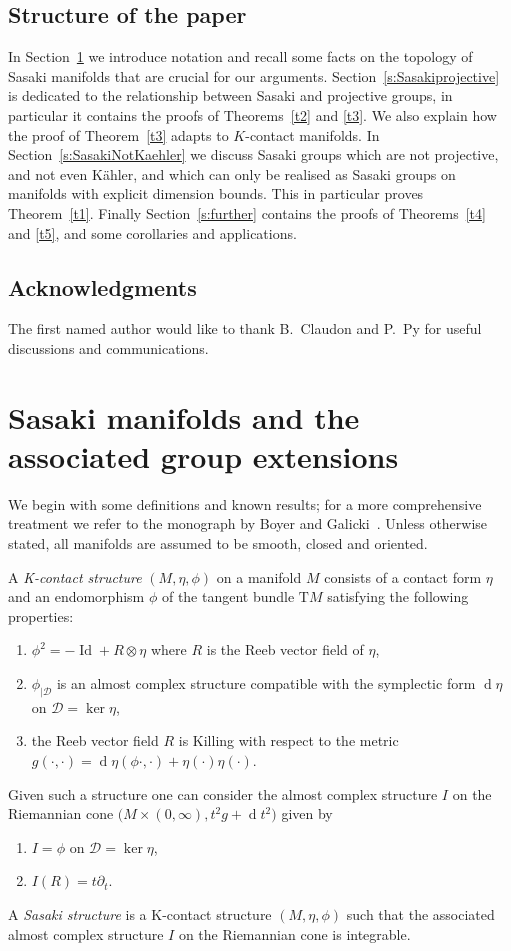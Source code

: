 \documentclass[12pt,leqno]{amsart}
\newcommand{\di}{{\operatorname{d}}}
\newcommand{\Id}{\operatorname{Id}}
\newcommand{\D}{\mathcal{D}}
\newcommand{\TM}{\text{T} M}
\begin{document}
\subsection{Structure of the paper}
In Section~\ref{sectiontop} we introduce notation and recall some facts on the topology of Sasaki manifolds 
that are crucial for our arguments.
Section~\ref{s:Sasakiprojective} is dedicated to the relationship between Sasaki and projective groups, in particular
it contains the proofs of Theorems~\ref{t2} and \ref{t3}. We also explain how the proof of Theorem~\ref{t3} adapts
to $K$-contact manifolds.
In Section~\ref{s:SasakiNotKaehler} we discuss Sasaki groups which are not projective, and not even K\"ahler,
and which can only be realised as Sasaki groups on manifolds with explicit dimension bounds. This in particular
proves Theorem~\ref{t1}.
Finally Section~\ref{s:further} contains the proofs of Theorems~\ref{t4} and \ref{t5}, and some corollaries and 
applications.

\subsection*{Acknowledgments} 
The first named author would like to thank B.~Claudon and P.~Py for useful discussions and communications.



\section{Sasaki manifolds and the associated group extensions}\label{sectiontop}

We begin with some definitions and known results; 
for a more comprehensive treatment we refer to the monograph by Boyer and Galicki~\cite{Boyer}. 
Unless otherwise stated, all manifolds are assumed to be smooth, closed and oriented.

A \textit{K-contact structure} $(M,\eta,\phi)$ on a manifold $M$ consists of a contact form $\eta$ and an endomorphism 
$\phi$ of the tangent bundle 
$\TM$ satisfying the following properties:
\begin{enumerate}
\item[$\bullet$] $\phi^2=-\Id+R\otimes\eta$ where $R$ is the Reeb vector field of $\eta$,
\item[$\bullet$] $\phi_{\vert\D}$ is an almost complex structure compatible with the symplectic form $\di\eta$ on $\D=\ker\eta$,
\item[$\bullet$] the Reeb vector field $R$ is Killing with respect to the metric $g(\cdot,\cdot)=\di\eta(\phi\cdot,\cdot)+\eta(\cdot)\eta(\cdot)$.
\end{enumerate}   
Given such a structure one can consider the almost complex structure $I$ on the Riemannian cone $\big( M\times(0,\infty),t^2g+\di t^2\big)$ given by
\begin{enumerate}
\item[$\bullet$] $I=\phi$ on $\D=\ker\eta$,
\item[$\bullet$] $I(R)=t\partial_t$.
\end{enumerate} 
A \textit{Sasaki structure} is a K-contact structure $(M,\eta,\phi)$ such that the associated almost complex structure $I$ on the Riemannian cone is integrable. 
\end{document}
